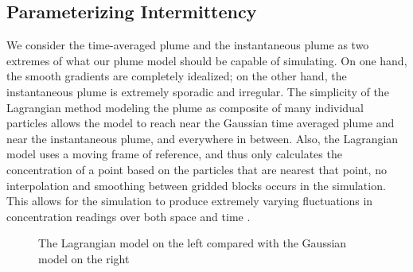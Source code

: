 \documentclass[ letterpaper, 10 pt, conference]{ieeeconf}  %
\begin{document}
\subsection{Parameterizing Intermittency}\label{part:tuning}

We consider the time-averaged plume and the instantaneous plume as two extremes of what our plume model should be capable of simulating.  On one hand, the smooth gradients are completely idealized;  on the other hand, the instantaneous plume is extremely sporadic and irregular.   
The simplicity of the Lagrangian method modeling the plume as composite of many individual particles allows the model to reach near the Gaussian time averaged plume and near the instantaneous plume, and everywhere in between.    %
Also, the Lagrangian model uses a moving frame of reference, and thus only calculates the concentration of a point based on the particles that are nearest that point, no interpolation and smoothing between gridded blocks occurs in the simulation.  This allows for the simulation to produce extremely varying fluctuations in concentration readings over both space and time \cite{Crimaldi2002} \cite{Jones1983} \cite{Webster2001} .  


\begin{figure}[thpb]
      \centering

      \caption{The Lagrangian model on the left compared with the Gaussian model on the right}
      \label{pic:tuneUp}
 \end{figure}
\end{document}
